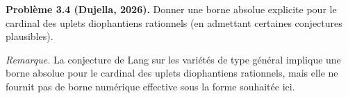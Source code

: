 \textbf{Problème 3.4 (Dujella, 2026).} Donner une borne absolue explicite pour le cardinal des uplets diophantiens rationnels (en admettant certaines conjectures plausibles).

\medskip

\textit{Remarque.} La conjecture de Lang sur les variétés de type général implique une borne absolue pour le cardinal des uplets diophantiens rationnels, mais elle ne fournit pas de borne numérique effective sous la forme souhaitée ici.
